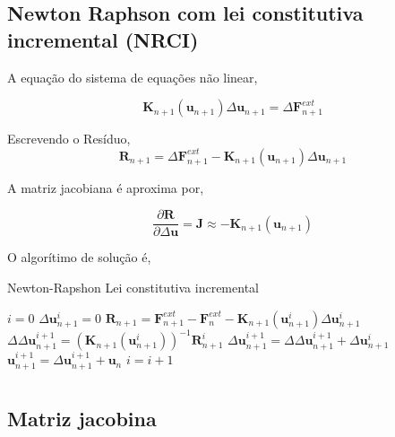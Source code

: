 \documentclass[12pt,a4paper]{article}
\begin{document}
 
\subsection{Newton Raphson com lei constitutiva incremental (NRCI)}

A equação do sistema de equações não linear,

\begin{equation}
\mathbf{K}_{n+1}(\mathbf{u}_{n+1}) \Delta \mathbf{u}_{n+1} = \Delta \mathbf{F}^{ext}_{n+1}
\end{equation}

\noindent 
Escrevendo o Resíduo,
\begin{equation}
\mathbf{R}_{n+1} = \Delta \mathbf{F}^{ext}_{n+1} - \mathbf{K}_{n+1}(\mathbf{u}_{n+1}) \Delta \mathbf{u}_{n+1} 
\end{equation}


\noindent 
A matriz jacobiana é aproxima por,

\begin{equation}
\frac{\partial \mathbf{R}}{\partial \Delta \mathbf{u}} = \mathbf{J} \approx - \mathbf{K}_{n+1}(\mathbf{u}_{n+1}) 
\end{equation}

\noindent
O algorítimo de solução é,

\begin{algorithm}[H]
	\caption{Newton-Rapshon Lei constitutiva incremental}
	\begin{algorithmic}
		\STATE $i = 0$
		\STATE $\Delta \mathbf{u}^{i}_{n+1} = 0$
		\STATE $\mathbf{R}_{n+1} = \mathbf{F}^{ext}_{n+1} - \mathbf{F}^{ext}_{n} - \mathbf{K}_{n+1}(\mathbf{u}^i_{n+1}) \Delta \mathbf{u}^i_{n+1}$ 
		\STATE $\Delta \Delta \mathbf{u}^{i+1}_{n+1} = \left(\mathbf{K}_{n+1}(\mathbf{u}^i_{n+1})\right)^{-1} \mathbf{R}^i_{n+1}$ 
		\STATE $\Delta \mathbf{u}^{i+1}_{n+1} = \Delta \Delta \mathbf{u}^{i+1}_{n+1} + \Delta \mathbf{u}^{i}_{n+1}$
		\STATE $\mathbf{u}^{i+1}_{n+1} = \Delta \mathbf{u}^{i+1}_{n+1} + \mathbf{u}_{n}$
		\STATE $i = i+1$
		\ENDWHILE		
	\end{algorithmic}
\end{algorithm}
 
 
\section{}

\subsection{Matriz jacobina}
\end{document}

